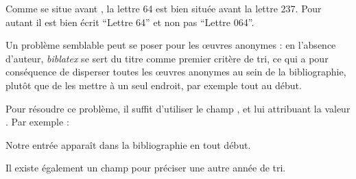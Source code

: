 Comme  se situe avant , la lettre 64 est bien située avant la lettre 237. Pour autant il est bien écrit \enquote{Lettre 64} et non pas \enquote{Lettre 064}.

Un problème semblable peut se poser pour les œuvres anonymes : en l'absence d'auteur, \emph{biblatex} se sert du titre comme premier critère de tri, ce qui a pour conséquence de disperser toutes les œuvres anonymes au sein de la bibliographie, plutôt que de les mettre à un seul endroit, par exemple tout au début.

Pour résoudre ce problème, il suffit d'utiliser le champ , et lui attribuant la valeur .
Par exemple :

\begin{latexcode}
@book{clef,
	Sortname = {0},
	Title = {Œuvre anonyme}
\end{latexcode}

Notre entrée  apparaît dans la bibliographie en tout début.

Il existe également un champ  pour préciser une autre année de tri. 
